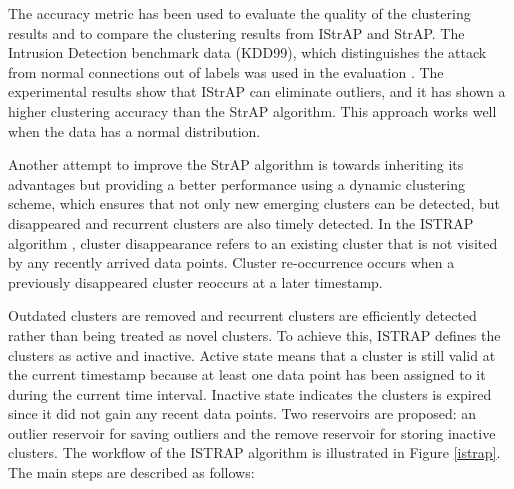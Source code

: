 
The accuracy metric has been used to evaluate the quality of the clustering results and to compare the clustering results from IStrAP and StrAP. The Intrusion Detection benchmark data (KDD99), which distinguishes the attack from normal connections out of labels was used in the evaluation \cite{li2012improved}. The experimental results show that IStrAP can eliminate outliers, and it has shown a higher clustering accuracy than the StrAP algorithm. This approach works well when the data has a normal distribution. %



Another attempt to improve the StrAP algorithm is towards inheriting its advantages but providing a better performance using a dynamic clustering scheme, which ensures that not only new emerging clusters can be detected, but disappeared and recurrent clusters are also timely detected. In the ISTRAP algorithm \cite{sui2018dynamic}, cluster disappearance refers to an existing cluster that is not visited by any recently arrived data points. Cluster re-occurrence occurs when a previously disappeared cluster reoccurs at a later timestamp. 

Outdated clusters are removed and recurrent clusters are efficiently detected rather than being treated as novel clusters. To achieve this, ISTRAP defines the clusters as active and inactive. Active state means that a cluster is still valid at the current timestamp because at least one data point has been assigned to it during the current time interval. Inactive state indicates the clusters is expired since it did not gain any recent data points. Two reservoirs are proposed: an outlier reservoir for saving outliers and the remove reservoir for storing inactive clusters. The workflow of the ISTRAP algorithm is illustrated in Figure \ref{istrap}. The main steps are described as follows:

